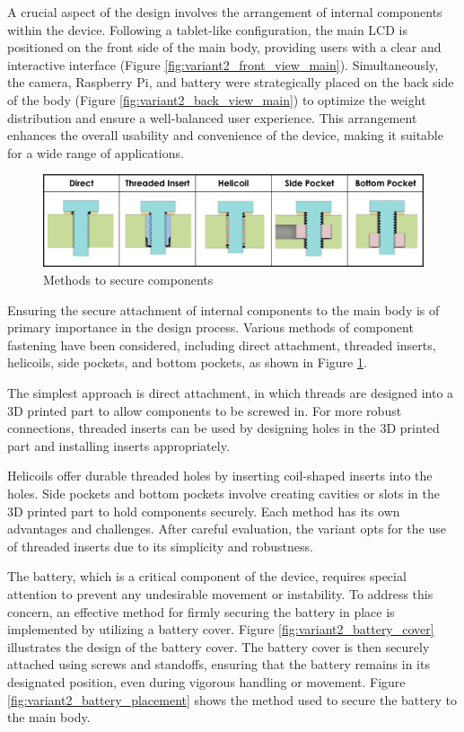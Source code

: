 A crucial aspect of the design involves the arrangement of internal components within the device. Following a tablet-like configuration, the main LCD is positioned on the front side of the main body, providing users with a clear and interactive interface (Figure \ref{fig:variant2_front_view_main}). Simultaneously, the camera, Raspberry Pi, and battery were strategically placed on the back side of the body (Figure \ref{fig:variant2_back_view_main}) to optimize the weight distribution and ensure a well-balanced user experience. This arrangement enhances the overall usability and convenience of the device, making it suitable for a wide range of applications.

\begin{figure}[ht!]
    \centering
    \includegraphics[width=\linewidth]{texs/Part1/chapter4/image/insert.png}
    \caption{Methods to secure components \cite{Hermann20}}
    \label{fig:insert}
\end{figure}

Ensuring the secure attachment of internal components to the main body is of primary importance in the design process. Various methods of component fastening have been considered, including direct attachment, threaded inserts, helicoils, side pockets, and bottom pockets, as shown in Figure \ref{fig:insert}.

The simplest approach is direct attachment, in which threads are designed into a 3D printed part to allow components to be screwed in. For more robust connections, threaded inserts can be used by designing holes in the 3D printed part and installing inserts appropriately.

Helicoils offer durable threaded holes by inserting coil-shaped inserts into the holes. Side pockets and bottom pockets involve creating cavities or slots in the 3D printed part to hold components securely. Each method has its own advantages and challenges. After careful evaluation, the variant opts for the use of threaded inserts due to its simplicity and robustness.

The battery, which is a critical component of the device, requires special attention to prevent any undesirable movement or instability. To address this concern, an effective method for firmly securing the battery in place is implemented by utilizing a battery cover. Figure \ref{fig:variant2_battery_cover} illustrates the design of the battery cover. The battery cover is then securely attached using screws and standoffs, ensuring that the battery remains in its designated position, even during vigorous handling or movement. Figure \ref{fig:variant2_battery_placement} shows the method used to secure the battery to the main body.

